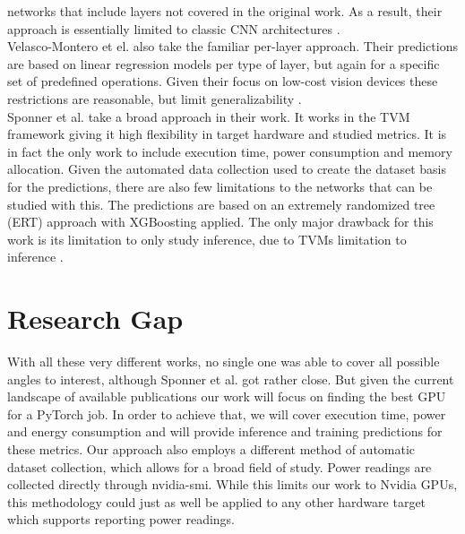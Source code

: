 networks that include layers not covered in the original work. As a result, their approach is essentially
limited to classic CNN architectures \cite{gianniti_performance_nodate}. \\
Velasco-Montero et el. also take the familiar per-layer approach. Their predictions are based on linear
regression models per type of layer, but again for a specific set of predefined operations. Given their 
focus on low-cost vision devices these restrictions are reasonable, but limit generalizability \cite{velasco-montero_previous_2020}. \\
Sponner et al. take a broad approach in their work. It works in the TVM framework giving it high flexibility
in target hardware and studied metrics. It is in fact the only work to include execution time, power
consumption and memory allocation. Given the automated data collection used to create the dataset basis
for the predictions, there are also few limitations to the networks that can be studied with this. 
The predictions are based on an extremely randomized tree (ERT) approach with XGBoosting applied. The 
only major drawback for this work is its limitation to only study inference, due to TVMs limitation to inference \cite{sponner_ai-driven_2022}. \\



\section{Research Gap}
With all these very different works, no single one was able to cover all possible angles to interest,
although Sponner et al. got rather close. But given the current landscape of available publications
our work will focus on finding the best GPU for a PyTorch job. In order to achieve that, we will cover
execution time, power and energy consumption and will provide inference and training predictions for these
metrics. Our approach also employs a different method of automatic dataset collection, which allows
for a broad field of study. Power readings are collected directly through nvidia-smi.
While this limits our work to Nvidia GPUs, this methodology could just as well be applied to any other hardware target which supports reporting power readings.
